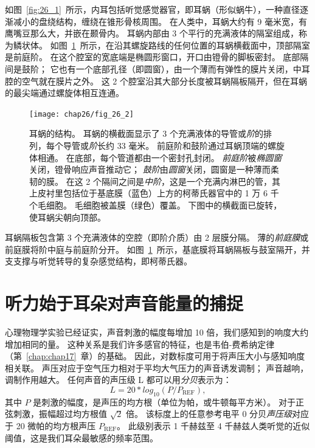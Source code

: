 如图~\ref{fig:26_1}~所示，内耳包括听觉感觉器官，即耳蜗（形似蜗牛），一种直径逐渐减小的盘绕结构，缠绕在锥形骨核周围。
在人类中，耳蜗大约有 9 毫米宽，有鹰嘴豆那么大，并嵌在颞骨内。
耳蜗内部由 3 个平行的充满液体的隔室组成，称为鳞状体。
如图~\ref{fig:26_2}~所示，在沿其螺旋路线的任何位置的耳蜗横截面中，顶部隔室是前庭阶。
在这个腔室的宽底端是椭圆形窗口，开口由镫骨的脚板密封。
底部隔间是鼓阶；
它也有一个底部孔径（即圆窗），由一个薄而有弹性的膜片关闭，中耳腔的空气就在膜片之外。
这 2 个腔室沿其大部分长度被耳蜗隔板隔开，但在耳蜗的最尖端通过螺旋体相互连通。


\begin{figure}[htbp]
	\centering
	\texttt{[image: chap26/fig\_26\_2]}
	\caption{耳蜗的结构。
		耳蜗的横截面显示了 3 个充满液体的导管或\textit{阶}的排列，每个导管或\textit{阶}长约 33 毫米。
		前庭阶和鼓阶通过耳蜗顶端的螺旋体相通。
		在底部，每个管道都由一个密封孔封闭。
		\textit{前庭阶}被\textit{椭圆窗}关闭，镫骨响应声音推动它；
		\textit{鼓阶}由\textit{圆窗}关闭，圆窗是一种薄而柔韧的膜。
		在这 2 个隔间之间是\textit{中阶}，这是一个充满内淋巴的管，其上皮衬里包括位于基底膜（蓝色）上方的柯蒂氏器官中的 1 万 6 千个毛细胞。
		毛细胞被盖膜（绿色）覆盖。
		下图中的横截面已旋转，使耳蜗尖朝向顶部。}
	\label{fig:26_2}
\end{figure}


耳蜗隔板包含第 3 个充满液体的空腔（即阶介质）由 2 层膜分隔。
薄的\textit{前庭膜}或前庭膜将阶中庭与前庭阶分开。
如图~\ref{fig:26_2}~所示，基底膜将耳蜗隔板与鼓室隔开，并支支撑与听觉转导的复杂感觉结构，即柯蒂氏器。



\section{听力始于耳朵对声音能量的捕捉}

心理物理学实验已经证实，声音刺激的幅度每增加 10 倍，我们感知到的响度大约增加相同的量。
这种关系是我们许多感官的特征，也是韦伯-费希纳定律（第~\ref{chap:chap17}~章）的基础。
因此，对数标度可用于将声压大小与感知响度相关联。 
声压对应于空气压力相对于平均大气压力的声音诱发调制；
声音越响，调制作用越大。
任何声音的声压级 L 都可以用\textit{分贝}表示为：
\begin{equation}\label{sound_pressure}
	L = 20 * log_{10} (P/P_{\text{REF}}),
\end{equation}
%
其中 $P$ 是刺激的幅度，是声压的均方根（单位为帕，或牛顿每平方米）。 
对于正弦刺激，振幅超过均方根值 $ \sqrt{2}$ 倍。
该标度上的任意参考电平 0 分贝\textit{声压级}对应于 20 微帕的均方根声压 $P_{\text{REF}}$。
此级别表示 1 千赫兹至 4 千赫兹人类听觉的近似阈值，这是我们耳朵最敏感的频率范围。


